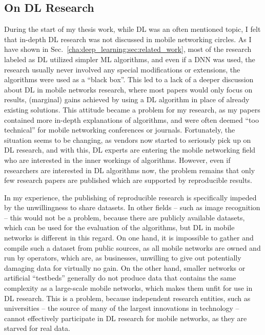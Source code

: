 		\subsection{On DL Research}
			\label{cha:conclusion:sec:dl_research}
			
			During the start of my thesis work, while \ac{DL} was an often mentioned topic, I felt that in-depth \ac{DL} research was not discussed in mobile networking circles.
			As I have shown in Sec.~\ref{cha:deep_learning:sec:related_work}, most of the research labeled as \ac{DL} utilized simpler \ac{ML} algorithms, and even if a \ac{DNN} was used, the research usually never involved any special modifications or extensions, the algorithms were used as a ``black box''.
			This led to a lack of a deeper discussion about \ac{DL} in mobile networks research, where most papers would only focus on results, (marginal) gains achieved by using a \ac{DL} algorithm in place of already existing solutions.
			This attitude became a problem for my research, as my papers contained more in-depth explanations of algorithms, and were often deemed ``too technical'' for mobile networking conferences or journals.
			Fortunately, the situation seems to be changing, as vendors now started to seriously pick up on \ac{DL} research, and with this, \ac{DL} experts are entering the mobile networking field who are interested in the inner workings of algorithms.
			However, even if researchers are interested in \ac{DL} algorithms now, the problem remains that only few research papers are published which are supported by reproducible results.		

			In my experience, the publishing of reproducible research is specifically impeded by the unwillingness to share datasets.
			In other fields -- such as image recognition -- this would not be a problem, because there are publicly available datasets, which can be used for the evaluation of the algorithms, but \ac{DL} in mobile networks is different in this regard.
			On one hand, it is impossible to gather and compile such a dataset from public sources, as all mobile networks are owned and run by operators, which are, as businesses, unwilling to give out potentially damaging data for virtually no gain.
			On the other hand, smaller networks or artificial ``testbeds'' generally do not produce data that contains the same complexity as a large-scale mobile networks, which makes them unfit for use in \ac{DL} research.
			This is a problem, because independent research entities, such as universities -- the source of many of the largest innovations in technology -- cannot effectively participate in \ac{DL} research for mobile networks, as they are starved for real data.
			
